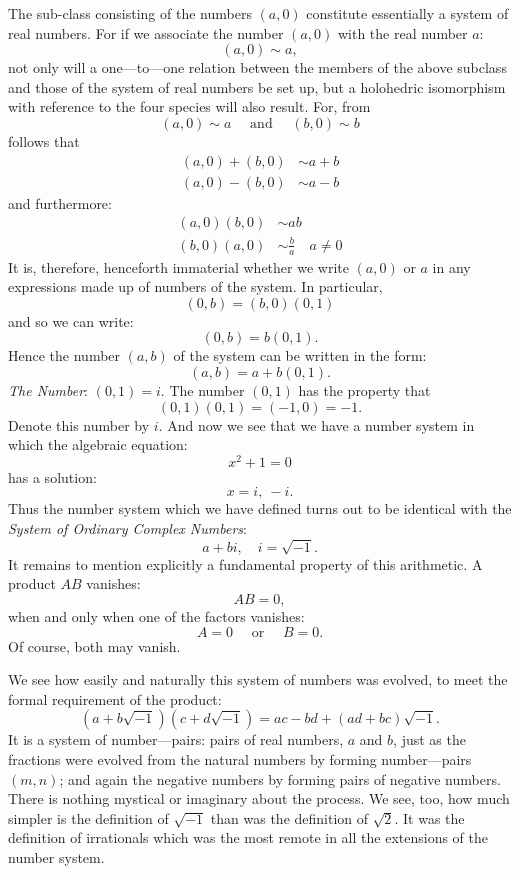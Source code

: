 The sub-class consisting of the numbers $(a,0)$ constitute essentially a system of real numbers. For if we associate the number $(a,0)$ with the real number $a$:
\[
	(a,0) \sim a
,\]  not only will a one---to---one relation between the members of the above subclass and those of the system of real numbers be set up, but a holohedric isomorphism with reference to the four species will also result. For, from
\[
	(a,0) \sim a \quad \text{ and } \quad (b,0) \sim b
\] follows that
\begin{align*}
	(a,0)+(b,0) &\sim a+b\\
	(a,0) - (b,0) &\sim a-b
\end{align*} and furthermore:
\begin{align*}
	(a,0)(b,0) &\sim ab\\
	(b,0)(a,0) &\sim \frac{b}{a} \quad a\neq 0
\end{align*} It is, therefore, henceforth immaterial whether we write $(a,0)$ or $a$ in any expressions made up of numbers of the system. In particular, 
\[
	(0,b)=(b,0)(0,1)
\] and so we can write:
\[
	(0,b)=b(0,1)
.\] Hence the number $(a,b)$ of the system can be written in the form:
\[
	(a,b)=a+b(0,1)
.\] \emph{The Number}: $(0,1)=i$. The number $(0,1)$ has the property that
\[
	(0,1)(0,1)=(-1,0)=-1
.\] Denote this number by $i$. And now we see that we have a number system in which the algebraic equation:
\[
x^2+1=0
\] has a solution:
\[
x=i,\: -i
.\] Thus the number system which we have defined turns out to be identical with the \emph{System of Ordinary Complex Numbers}:
\[
a+bi, \quad i=\sqrt{-1} 
.\] It remains to mention explicitly a fundamental property of this arithmetic. A product $AB$ vanishes:
\[
AB=0
,\] when and only when one of the factors vanishes:
\[
A=0 \quad \text{ or } \quad B=0
.\] Of course, both may vanish.

We see how easily and naturally this system of numbers was evolved, to meet the formal requirement of the product:
\[
	(a+b\sqrt{-1} )(c+d\sqrt{-1} )=ac-bd+(ad+bc)\sqrt{-1} 
.\] It is a system of number---pairs: pairs of real numbers, $a$ and $b$, just as the fractions were evolved from the natural numbers by forming number---pairs $(m,n)$; and again the negative numbers by forming pairs of negative numbers. There is nothing mystical or imaginary about the process. We see, too, how much simpler is the definition of $\sqrt{-1} $ than was the definition of $\sqrt{2} $. It was the definition of irrationals which was the most remote in all the extensions of the number system. 

